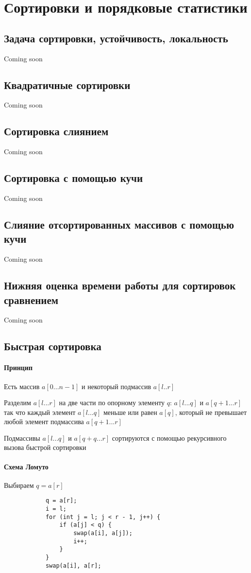 \documentclass[a4paper,10pt]{article}
\begin{document}
	\section{Сортировки и порядковые статистики}
	\subsection{Задача сортировки, устойчивость, локальность}
	Coming soon
	\subsection{Квадратичные сортировки}
	Coming soon
	\subsection{Сортировка слиянием}
	Coming soon
	\subsection{Сортировка с помощью кучи}
	Coming soon	
	\subsection{Слияние отсортированных массивов с помощью кучи}
	Coming soon	
	\subsection{Нижняя оценка времени работы для сортировок сравнением}
	Coming soon
	\subsection{Быстрая сортировка}
	\paragraph{Принцип}
	Есть массив $a[0...n-1]$ и некоторый подмассив $a[l..r]$
	\begin{center}
		\item Разделим $a[l...r]$ на две части по опорному элементу $q$: $a[l...q]$ и $a[q+1...r]$ так что каждый элемент $a[l...q]$ меньше или равен $a[q]$, который не превышает любой элемент подмассива $a[q+1...r]$
		\item Подмассивы $a[l...q]$ и $a[q+q...r]$ сортируются с помощью рекурсивного вызова быстрой сортировки
	\end{center}
	\paragraph{Схема Ломуто}
	\begin{center}
		\item Выбираем $q = a[r]$
		\begin{lstlisting}
			q = a[r];
			i = l;
			for (int j = l; j < r - 1, j++) {
				if (a[j] < q) {
					swap(a[i], a[j]);
					i++;
				}
			}
			swap(a[i], a[r];
		\end{lstlisting}
	\end{center}
	\newpage
\end{document}
